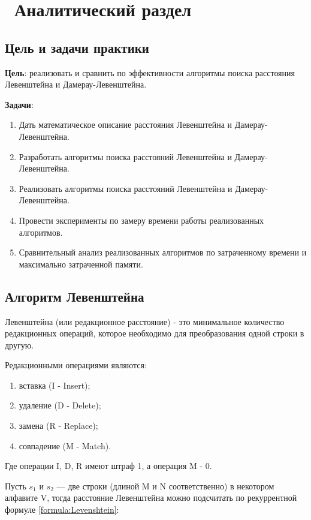 \chapter{ Аналитический раздел}
\label{cha:analytical}
    \section{Цель и задачи практики}

    {\bf Цель}: реализовать и сравнить по эффективности алгоритмы поиска
    расстояния Левенштейна и Дамерау-Левенштейна.

    {\bf Задачи}:
    \begin{enumerate}
        \item Дать математическое описание расстояния Левенштейна и Дамерау-Левенштейна.
        \item Разработать алгоритмы поиска расстояний Левенштейна и Дамерау-Левенштейна.
        \item Реализовать алгоритмы поиска расстояний Левенштейна и Дамерау-Левенштейна.
        \item Провести эксперименты по замеру времени работы реализованных алгоритмов.
        \item Сравнительный анализ реализованных алгоритмов по затраченному времени и максимально затраченной памяти.
    \end{enumerate}

    \section{Алгоритм Левенштейна}

    { Левенштейна} (или редакционное расстояние) - это минимальное
    количество редакционных операций, которое необходимо для преобразования одной строки в другую.

    Редакционными операциями являются: \begin{enumerate}
        \item вставка (I - Insert);
        \item удаление (D - Delete);
        \item замена (R - Replace);
        \item совпадение (M - Match).
    \end{enumerate}
    
    Где операции I, D, R имеют штраф 1, а операция M - 0.

    Пусть $s_{1}$ и $s_{2}$ — две строки (длиной M и N соответственно) в некотором алфавите V,
    тогда расстояние Левенштейна можно подсчитать по рекуррентной формуле \ref{formula:Levenshtein}:

